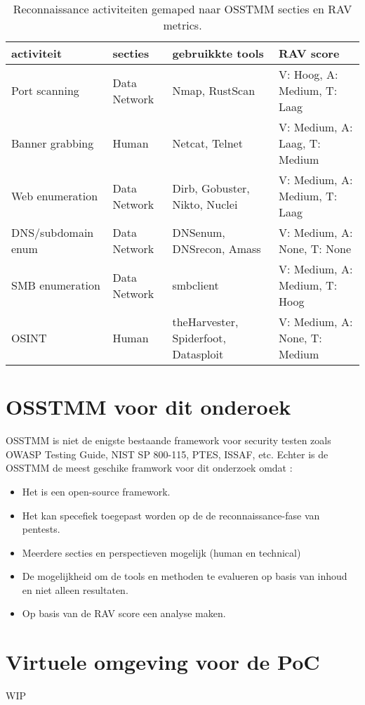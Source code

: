 \begin{table}[H]
  \centering
  \footnotesize
  \begin{tabularx}{\linewidth}{l l X l}
    \toprule
    \textbf{activiteit} & \textbf{secties} & \textbf{gebruikkte tools} & \textbf{RAV score} \\
    \midrule
    Port scanning       & Data Network & Nmap, RustScan                       & V: Hoog,   A: Medium, T: Laag \\
    Banner grabbing     & Human        & Netcat, Telnet                       & V: Medium, A: Laag,   T: Medium \\
    Web enumeration     & Data Network & Dirb, Gobuster, Nikto, Nuclei        & V: Medium, A: Medium, T: Laag \\
    DNS/subdomain enum  & Data Network & DNSenum, DNSrecon, Amass             & V: Medium, A: None,   T: None \\
    SMB enumeration     & Data Network & smbclient                            & V: Medium, A: Medium, T: Hoog \\
    OSINT               & Human        & theHarvester, Spiderfoot, Datasploit & V: Medium, A: None,   T: Medium \\
    \bottomrule
  \end{tabularx}
  \caption[activiteieten in OSSTMM]{\label{tab:recon}Reconnaissance activiteiten gemaped naar OSSTMM secties en RAV metrics.}
\end{table}

\section{OSSTMM voor dit onderoek}

OSSTMM is niet de enigste bestaande framework voor security testen zoals OWASP Testing Guide, NIST SP 800-115, PTES, ISSAF, etc.
Echter is de OSSTMM de meest geschike framwork voor dit onderzoek omdat :

\begin{itemize}
  \item Het is een open-source framework.
  \item Het kan specefiek toegepast worden op de de reconnaissance-fase van pentests.
  \item Meerdere secties en perspectieven mogelijk (human en technical)
  \item De mogelijkheid om de tools en methoden te evalueren op basis van inhoud en niet alleen resultaten.
  \item Op basis van de RAV score een analyse maken.
\end{itemize}


\section{Virtuele omgeving voor de PoC}
WIP
